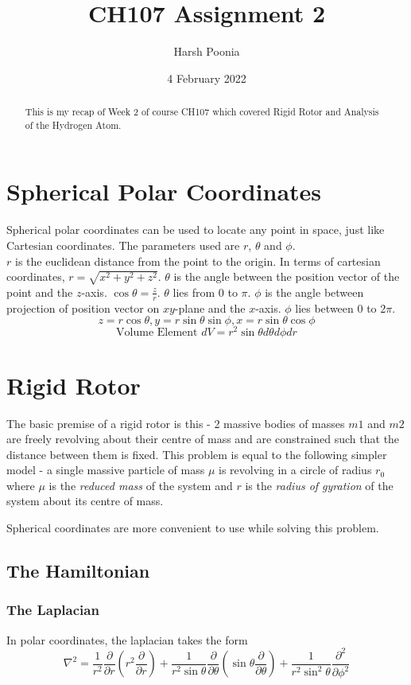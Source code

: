 \documentclass[12pt]{article}
\title{CH107 Assignment 2}
\author{Harsh Poonia}
\date{4 February 2022}
\begin{document}
\maketitle
\begin{abstract}
    This is my recap of Week 2 of course CH107 which covered Rigid Rotor and Analysis of the Hydrogen Atom.
\end{abstract}
\section*{Spherical Polar Coordinates}
Spherical polar coordinates can be used to locate any point in space, just like Cartesian coordinates.
The parameters used are $r$, $\theta$ and $\phi$. \\
$r$ is the euclidean distance from the point to the origin. In terms of cartesian coordinates, $r=\sqrt{x^2+y^2+z^2}$. 
$\theta$ is the angle between the position vector of the point and the $z$-axis. $\cos \theta = \frac{z}{r}$. $\theta$ lies from $0$ to $\pi$.
$\phi$ is the angle between projection of position vector on $xy$-plane and the $x$-axis. $\phi$ lies between $0$ to $2\pi$.
\[z=r \cos \theta, y=r \sin \theta \sin \phi, x= r \sin \theta \cos \phi\]
\[\text{Volume Element } dV = r^2 \sin \theta d\theta d\phi dr\]

\section{Rigid Rotor}
The basic premise of a rigid rotor is this - 2 massive bodies of masses $m1$ and $m2$ are freely revolving about their centre of mass and are constrained such that the distance between them is fixed. This problem is equal to the following simpler model - a single massive particle of mass $\mu $ is revolving in a circle of radius $r_0$ where $\mu$ is the \emph{reduced mass} of the system and $r$ is the \emph{radius of gyration} of the system about its centre of mass. 

Spherical coordinates are more convenient to use while solving this problem.
\subsection*{The Hamiltonian}
\subsubsection*{The Laplacian}
In polar coordinates, the laplacian takes the form
\[\nabla^2 = \frac{1}{r^2} \frac{\partial}{\partial r} \left(r^2 \frac{\partial}{\partial r}\right) + \frac{1}{r^2 \sin\theta} \frac{\partial}{\partial \theta } \left(\sin \theta \frac{\partial}{\partial \theta }\right) +  \frac{1}{r^2 \sin^2{\theta}} \frac{\partial^2}{\partial \phi^2 } \]
\end{document}
